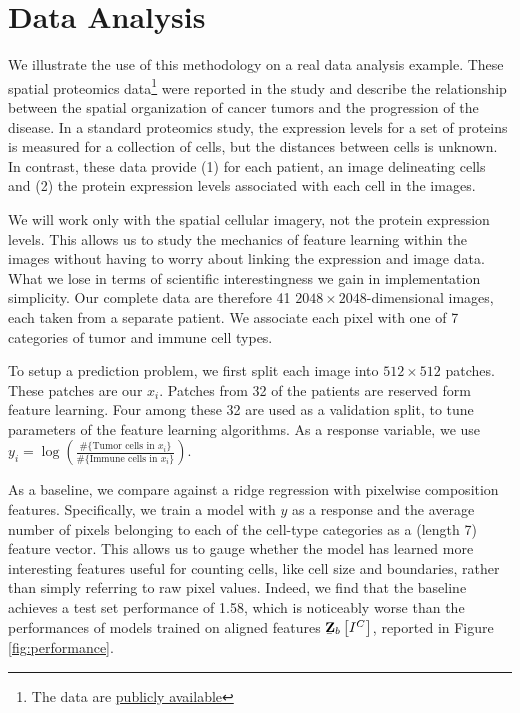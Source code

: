 
\section{Data Analysis}

We illustrate the use of this methodology on a real data analysis example. These
spatial proteomics data\footnote{The data are
  \href{https://www.angelolab.com/mibi-data}{publicly available}} were reported
in the study \citep{keren2018structured} and describe the relationship between
the spatial organization of cancer tumors and the progression of the disease. In
a standard proteomics study, the expression levels for a set of proteins is
measured for a collection of cells, but the distances between cells is unknown.
In contrast, these data provide (1) for each patient, an image delineating cells
and (2) the protein expression levels associated with each cell in the images.

We will work only with the spatial cellular imagery, not the protein expression
levels. This allows us to study the mechanics of feature learning within the
images without having to worry about linking the expression and image data. What
we lose in terms of scientific interestingness we gain in implementation
simplicity. Our complete data are therefore 41 $2048 \times 2048$-dimensional
images, each taken from a separate patient. We associate each pixel with one of
7 categories of tumor and immune cell types.

To setup a prediction problem, we first split each image into $512 \times 512$
patches. These patches are our $x_{i}$. Patches from 32 of the patients are
reserved form feature learning. Four among these 32 are used as a validation
split, to tune parameters of the feature learning algorithms. As a response
variable, we use $y_{i} = \log\left(\frac{\#\{\text{Tumor cells in }x_{i}\}}{\#\{\text{Immune cells in }x_i\}}\right)$.

As a baseline, we compare against a ridge regression with pixelwise composition
features. Specifically, we train a model with $y$ as a response and the average
number of pixels belonging to each of the cell-type categories as a (length 7)
feature vector. This allows us to gauge whether the model has learned more
interesting features useful for counting cells, like cell size and boundaries,
rather than simply referring to raw pixel values. Indeed, we find that the
baseline achieves a test set performance of 1.58, which is noticeably worse than
the performances of models trained on aligned features
$\underaccent{\bar}{\mathbf{Z}}_{b}\left[I^{C}\right]$, reported in Figure
\ref{fig:performance}.


